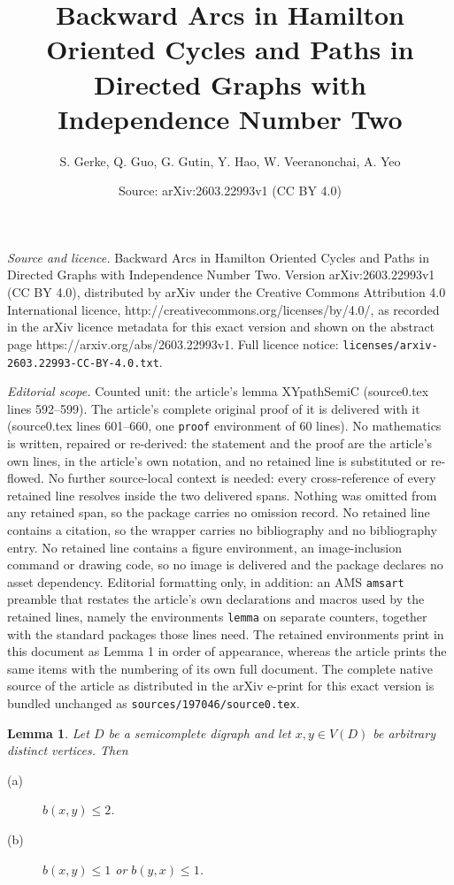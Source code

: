 \documentclass[10pt,a4paper]{amsart}
\title{Backward Arcs in Hamilton Oriented Cycles and Paths in Directed Graphs with Independence Number Two}
\author{S. Gerke, Q. Guo, G. Gutin, Y. Hao, W. Veeranonchai, A. Yeo}
\date{Source: arXiv:2603.22993v1 (CC BY 4.0)}
\newtheorem{lemma}{Lemma}
\begin{document}
\maketitle

\noindent\emph{Source and licence.} Backward Arcs in Hamilton Oriented Cycles and Paths in Directed Graphs with Independence Number Two. Version arXiv:2603.22993v1 (CC BY 4.0), distributed by arXiv under the Creative Commons Attribution 4.0 International licence, http://creativecommons.org/licenses/by/4.0/, as recorded in the arXiv licence metadata for this exact version and shown on the abstract page https://arxiv.org/abs/2603.22993v1. Full licence notice: \texttt{licenses/arxiv-2603.22993-CC-BY-4.0.txt}.\par\smallskip

\noindent\textit{Editorial scope.} Counted unit: the article's lemma XYpathSemiC (source0.tex lines 592--599). The article's complete original proof of it is delivered with it (source0.tex lines 601--660, one \texttt{proof} environment of 60 lines). No mathematics is written, repaired or re-derived: the statement and the proof are the article's own lines, in the article's own notation, and no retained line is substituted or re-flowed.  No further source-local context is needed: every cross-reference of every retained line resolves inside the two delivered spans.  Nothing was omitted from any retained span, so the package carries no omission record.  No retained line contains a citation, so the wrapper carries no bibliography and no bibliography entry.  No retained line contains a figure environment, an image-inclusion command or drawing code, so no image is delivered and the package declares no asset dependency.  Editorial formatting only, in addition: an AMS \texttt{amsart} preamble that restates the article's own declarations and macros used by the retained lines, namely the environments \texttt{lemma} on separate counters, together with the standard packages those lines need.  The retained environments print in this document as Lemma 1 in order of appearance, whereas the article prints the same items with the numbering of its own full document.  The complete native source of the article as distributed in the arXiv e-print for this exact version is bundled unchanged as \texttt{sources/197046/source0.tex}.
\begin{lemma} \label{lem: XYpathSemiC}
Let $D$ be a semicomplete digraph and let $x,y \in V(D)$ be arbitrary distinct vertices. Then 
\begin{description}
\item[(a)] $b(x,y)\le2$.

\item[(b)] $b(x,y)\le 1$ or $b(y,x)\le 1$.
\end{description}
\end{lemma}
\end{document}
